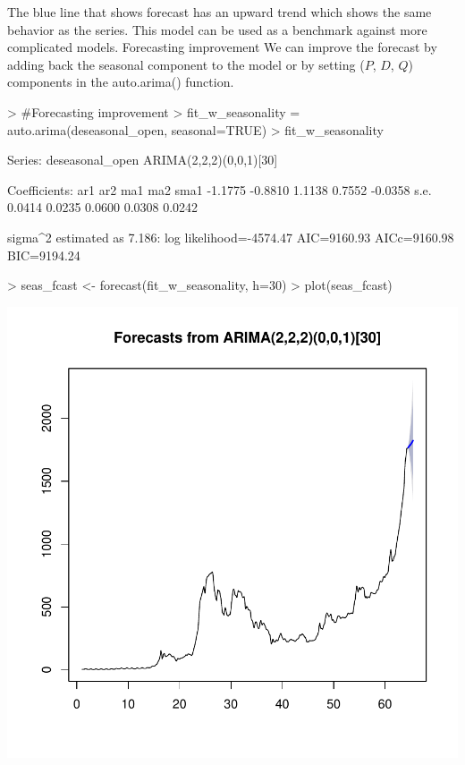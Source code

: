\documentclass{article}
\begin{document}
The blue line that shows forecast has an upward trend which shows the same behavior as the series. This model can be used as a benchmark against more complicated models.
Forecasting improvement  
We can improve the forecast by adding back the seasonal component to the model or by setting ($P$, $D$, $Q$) components in the auto.arima() function. 
\begin{Schunk}
\begin{Sinput}
> #Forecasting improvement
>  fit_w_seasonality = auto.arima(deseasonal_open, seasonal=TRUE)
>  fit_w_seasonality
\end{Sinput}
\begin{Soutput}
Series: deseasonal_open 
ARIMA(2,2,2)(0,0,1)[30] 

Coefficients:
          ar1      ar2     ma1     ma2     sma1
      -1.1775  -0.8810  1.1138  0.7552  -0.0358
s.e.   0.0414   0.0235  0.0600  0.0308   0.0242

sigma^2 estimated as 7.186:  log likelihood=-4574.47
AIC=9160.93   AICc=9160.98   BIC=9194.24
\end{Soutput}
\begin{Sinput}
>  seas_fcast <- forecast(fit_w_seasonality, h=30)
>  plot(seas_fcast)
\end{Sinput}
\end{Schunk}
\includegraphics{Report-021}
\end{document}
